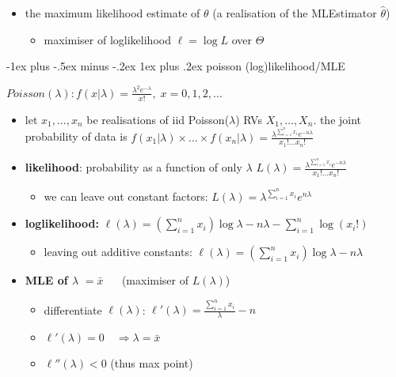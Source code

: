 \documentclass[10pt, landscape]{article}
\makeatletter
\renewcommand{\subsubsection}{\@startsection{subsubsection}{3}{0mm}%
  {-1ex plus -.5ex minus -.2ex}%
  {1ex plus .2ex}%
{\normalfont\small\bfseries}}%
\newcommand{\xbar}{\bar{x}}
\newcommand{\seq}[2][n]{#2_1, \dots, #2_{#1}}
\makeatother
\begin{document}
\begin{multicols*}{4}
  \begin{itemize}
    \item {} the maximum likelihood estimate of $\theta$ (a realisation of the MLEstimator $\hat\theta$)
      \begin{itemize}
        \item maximiser of loglikelihood $\ell = \log L$ over $\Theta$
      \end{itemize}
  \end{itemize}

  \subsubsection{poisson (log)likelihood/MLE}

  $Poisson(\lambda): f(x \vert \lambda) = \frac{\lambda^2e^{-\lambda}}{x!}, \; x = 0,1,2,\dots$

  \begin{itemize}
    \item let $\seq{x}$ be realisations of iid Poisson($\lambda$) RVs $\seq X$. 
      the joint probability of data is  $f(x_1 \vert \lambda) \times \dots \times f(x_n\vert \lambda) = \frac{\lambda^{\sum^n_{i=1} x_i} e^{-n\lambda}}{x_1! \dots x_n!}$
    \item \textbf{likelihood}: probability as a function of only $\lambda$ 
      $L(\lambda) = \frac{\lambda^{\sum^n_{i=1} x_i} e^{-n\lambda}}{x_1! \dots x_n!}$
      \begin{itemize}
        \item we can leave out constant factors: $L(\lambda) = \lambda^{\sum^n_{i=1}x_i} e^{n\lambda}$
      \end{itemize}
    \item \textbf{loglikelihood:} $\ell(\lambda) = (\sum^n_{i=1} x_i) \log \lambda - n\lambda - \sum^{n}_{i=1}\log(x_i!)$
      \begin{itemize}
        \item leaving out additive constants: $\ell(\lambda) = (\sum^n_{i=1}x_i) \log \lambda- n \lambda$
      \end{itemize}
    \item \textbf{MLE of $\lambda$} $= \xbar$ $\quad$ (maximiser of $L(\lambda)$)

      \begin{itemize}
        \item differentiate $\ell(\lambda)$: $\ell'(\lambda) = \frac{\sum^{n}_{i=1} x_i}{\lambda} - n$
        \item $\ell'(\lambda) = 0 \quad \Rightarrow \lambda = \xbar$ 
        \item $\ell''(\lambda) < 0$ (thus max point)
      \end{itemize}
  \end{itemize}


\end{multicols*}
\end{document}
